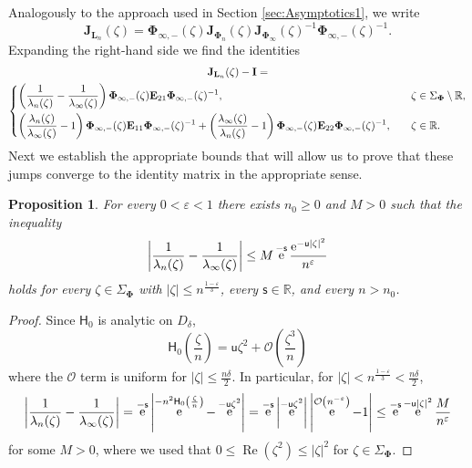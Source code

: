 \documentclass[reqno,a4paper,11pt]{amsart}
\DeclareMathOperator{\re}{Re}
\DeclareMathOperator{\ee}{\rm e}
\newcommand{\R}{\mathbb{R}}
\newcommand{\Boh}{\mathcal{O}}
\renewcommand{\bm}{\mathbf}
\newcommand{\msf}{\mathsf}
\newcommand{\sad}{\msf s}
\newcommand{\uad}{\msf u}
\newtheorem{prop}[theorem]{Proposition}
\theoremstyle{definition}
\theoremstyle{remark}
\numberwithin{equation}{section}
\begin{document}
Analogously to the approach used in Section \ref{sec:Asymptotics1}, we write
%
\begin{equation}\label{eq:Asymptotics2_jump_at_R}
    \bm J_{\bm L_n}(\zeta) = \bm \Phi_{\infty, -}(\zeta) \bm J_{\bm \Phi_n}(\zeta) \bm J_{\bm \Phi_\infty}(\zeta)^{-1} \bm \Phi_{\infty, -}(\zeta)^{-1}.
\end{equation}
%
Expanding the right-hand side we find the identities
\begin{multline}\label{eq:jump_asymptotics2}
    \bm J_{\bm L_n}(\zeta) - \bm I =  \\
    \begin{dcases}
        \left( \frac{1}{\lambda_n(\zeta)} - \frac{1}{\lambda_\infty(\zeta)} \right) \bm \Phi_{\infty, -}(\zeta) \bm E_{21} \bm \Phi_{\infty, -}(\zeta)^{-1}, \quad 
        & \zeta \in \Sigma_{\bm \Phi} \setminus \R, \\
        \left(  \frac{\lambda_n(\zeta)}{\lambda_\infty(\zeta)} - 1\right) \bm \Phi_{\infty, -}(\zeta) \bm E_{11} \bm \Phi_{\infty, -}(\zeta)^{-1} + \left(  \frac{\lambda_\infty(\zeta)}{\lambda_n(\zeta)} - 1\right) \bm \Phi_{\infty, -}(\zeta) \bm E_{22} \bm  \Phi_{\infty, -}(\zeta)^{-1}, \quad
        &\zeta \in \R.
    \end{dcases}
\end{multline}
    Next we establish the appropriate bounds that will allow us to prove that these jumps converge to the identity matrix in the appropriate sense.


\begin{prop}\label{lem:asymptotics2_lem1}
    For every $0 < \varepsilon < 1$ there exists $n_0 \geq 0$ and $M > 0$ such that the inequality
    \[
        \left| \frac{1}{\lambda_n (\zeta)} - \frac{1}{\lambda_\infty(\zeta)}\right|
        \leq M \ee^{- \sad}\frac{ \ee^{- \uad |\zeta|^2}}{n^{\varepsilon}} 
    \]
    holds for every $\zeta\in \Sigma_{\bm \Phi}$ with $|\zeta| \leq n^{\frac{1-\varepsilon}{3}}$, every $\sad\in \R$, and every $n > n_0$.
\end{prop}

\begin{proof}
    Since $\msf H_0$ is analytic on $D_\delta$, 
    \[
        \msf H_0\left( \frac{\zeta}{n} \right) = \uad \zeta^2 + \Boh \left( \frac{ \zeta^3}{n}\right)
    \]
    where the $\Boh$ term is uniform for $| \zeta | \leq  \frac{n \delta}{2}$. In particular, for $|\zeta| < n^{\frac{1-\varepsilon}{3}} < \frac{n \delta}{2}$,
    \[
         \left| \frac{1}{\lambda_n (\zeta)} - \frac{1}{\lambda_\infty(\zeta)}\right|  
            =  \ee^{- \sad} \left| \ee^{-n^2 \msf H_0 \left( \frac{\zeta}{n}\right)} - \ee^{- \uad \zeta^2}\right| 
            = \ee^{-\sad} \left| \ee^{- \uad \zeta^2} \right| \left| \ee^{\Boh \left( n^{-\varepsilon}\right)} - 1\right|  \leq \ee^{- \sad} \ee^{ - \uad |\zeta|^2} \frac{M}{ n^{\varepsilon}}
    \]
    for some $M > 0$, where we used that $0\leq \re (\zeta^2)\leq |\zeta|^2$ for $\zeta\in \Sigma_{\bm \Phi}$.
\end{proof}
\end{document}
